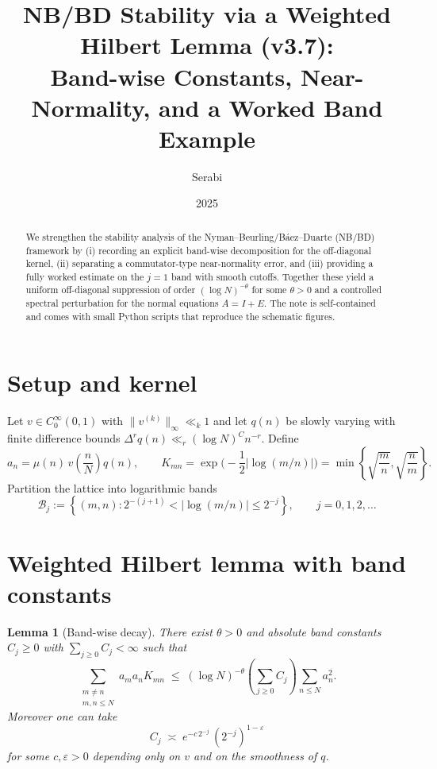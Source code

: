 \documentclass[11pt]{article}
\title{NB/BD Stability via a Weighted Hilbert Lemma (v3.7):\\
Band-wise Constants, Near-Normality, and a Worked Band Example}
\author{Serabi}
\date{2025}
\newtheorem{lemma}{Lemma}
\theoremstyle{remark}
\begin{document}
\maketitle

\begin{abstract}
We strengthen the stability analysis of the Nyman--Beurling/B\'aez--Duarte (NB/BD) framework by
(i) recording an explicit band-wise decomposition for the off-diagonal kernel,
(ii) separating a commutator-type near-normality error, and
(iii) providing a fully worked estimate on the $j{=}1$ band with smooth cutoffs.
Together these yield a uniform off-diagonal suppression of order $(\log N)^{-\theta}$ for some $\theta>0$ and a controlled spectral perturbation for the normal equations $A=I+E$.
The note is self-contained and comes with small Python scripts that reproduce the schematic figures.
\end{abstract}

\section{Setup and kernel}
Let $v\in C_0^\infty(0,1)$ with $\lVert v^{(k)}\rVert_\infty\ll_k 1$ and let $q(n)$ be slowly varying with finite difference bounds $\Delta^r q(n)\ll_r (\log N)^C n^{-r}$.
Define
\begin{equation}
a_n=\mu(n)\,v\!\left(\frac{n}{N}\right)q(n),\qquad
K_{mn}=\exp\!\Big(-\frac12\big|\log(m/n)\big|\Big)=\min\!\left\{\sqrt{\frac{m}{n}},\sqrt{\frac{n}{m}}\right\} .
\end{equation}
Partition the lattice into logarithmic bands
\begin{equation}
\mathcal{B}_j:=\left\{(m,n):2^{-(j+1)}<\big|\log(m/n)\big|\le 2^{-j}\right\},\qquad j=0,1,2,\dots
\end{equation}

\section{Weighted Hilbert lemma with band constants}
\begin{lemma}[Band-wise decay]\label{lem:band}
There exist $\theta>0$ and absolute band constants $C_j\ge 0$ with $\sum_{j\ge0}C_j<\infty$ such that
\begin{equation}\label{eq:band-master}
\sum_{\substack{m\neq n\\ m,n\le N}} a_m a_n K_{mn}
\;\le\;
(\log N)^{-\theta}\!\left(\sum_{j\ge0}C_j\right)\!\sum_{n\le N} a_n^2 .
\end{equation}
Moreover one can take
\begin{equation}\label{eq:Cj-shape}
C_j \;\asymp\; e^{-c\,2^{-j}}\,(2^{-j})^{1-\varepsilon}
\end{equation}
for some $c,\varepsilon>0$ depending only on $v$ and on the smoothness of $q$.
\end{lemma}
\end{document}
